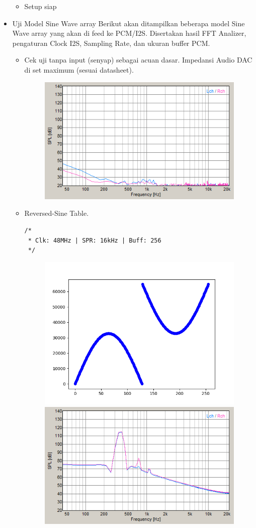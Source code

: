 \documentclass[12pt,]{article}
\begin{document}
\begin{itemize}
\begin{itemize}
			\item Setup siap
		\end{itemize}
		
		\item Uji Model Sine Wave array
		Berikut akan ditampilkan beberapa model Sine Wave array yang akan di feed ke PCM/I2S.
		Disertakan hasil FFT Analizer, pengaturan Clock I2S, Sampling Rate, dan ukuran buffer PCM.   
		
		\begin{itemize}
			\item Cek uji tanpa input (senyap) sebagai acuan dasar.
			Impedansi Audio DAC di set maximum (sesuai datasheet).
			\begin{figure}[H]
				\centering
				\includegraphics[width=0.5\linewidth]{result/day_1/BaseZero}
			\end{figure}
		
			\newpage
			\item Reversed-Sine Table.
			\begin{verbatim}
/*
 * Clk: 48MHz | SPR: 16kHz | Buff: 256
 */	
			\end{verbatim}
			\begin{figure}[H]
				\centering
				\includegraphics[width=0.45\linewidth]{result/day_1/rev_sine_table}
				\includegraphics[width=0.45\linewidth]{result/day_1/tableMax256}
			\end{figure}
		

\end{itemize}
\end{itemize}
\end{document}
